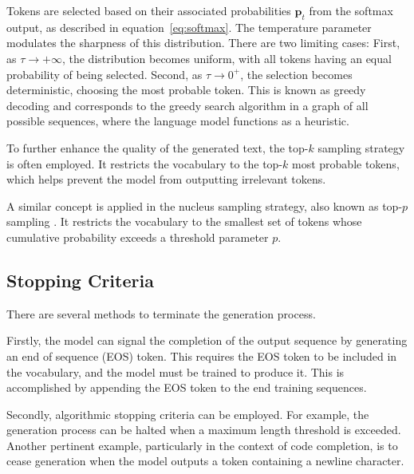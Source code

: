 Tokens are selected based on their associated probabilities \(\mathbf{p}_t\) from the softmax output, as described in equation~\ref{eq:softmax}. The temperature parameter modulates the sharpness of this distribution. There are two limiting cases: First, as \(\tau \to +\infty\), the distribution becomes uniform, with all tokens having an equal probability of being selected. Second, as \(\tau \to 0^+\), the selection becomes deterministic, choosing the most probable token. This is known as greedy decoding and corresponds to the greedy search algorithm in a graph of all possible sequences, where the language model functions as a heuristic.

To further enhance the quality of the generated text, the top-\(k\) sampling strategy is often employed. It restricts the vocabulary to the top-\(k\) most probable tokens, which helps prevent the model from outputting irrelevant tokens.

A similar concept is applied in the nucleus sampling strategy, also known as top-\(p\) sampling \parencite{holtzman2019}. It restricts the vocabulary to the smallest set of tokens whose cumulative probability exceeds a threshold parameter \(p\).

\subsection{Stopping Criteria}

There are several methods to terminate the generation process.

Firstly, the model can signal the completion of the output sequence by generating an end of sequence (EOS) token. This requires the EOS token to be included in the vocabulary, and the model must be trained to produce it. This is accomplished by appending the EOS token to the end training sequences.

Secondly, algorithmic stopping criteria can be employed. For example, the generation process can be halted when a maximum length threshold is exceeded. Another pertinent example, particularly in the context of code completion, is to cease generation when the model outputs a token containing a newline character.

